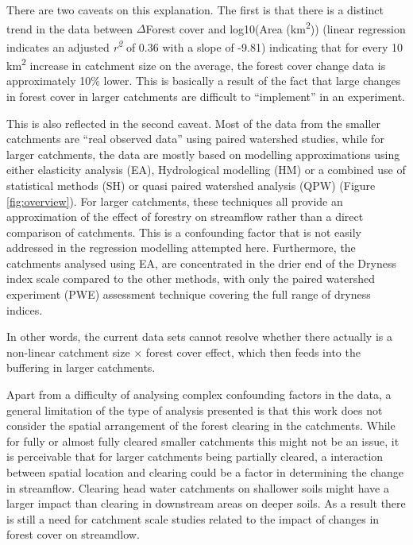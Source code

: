 \documentclass[]{elsarticle} %
\begin{document}
There are two caveats on this explanation. The first is that there is a distinct trend in the data between \(\Delta\)Forest cover and log10(Area (km\textsuperscript{2})) (linear regression indicates an adjusted \emph{r\textsuperscript{2}} of 0.36 with a slope of -9.81) indicating that for every 10 km\textsuperscript{2} increase in catchment size on the average, the forest cover change data is approximately 10\% lower. This is basically a result of the fact that large changes in forest cover in larger catchments are difficult to ``implement'' in an experiment.

This is also reflected in the second caveat. Most of the data from the smaller catchments are ``real observed data'' using paired watershed studies, while for larger catchments, the data are mostly based on modelling approximations using either elasticity analysis (EA), Hydrological modelling (HM) or a combined use of statistical methods (SH) or quasi paired watershed analysis (QPW) (Figure \ref{fig:overview}). For larger catchments, these techniques all provide an approximation of the effect of forestry on streamflow rather than a direct comparison of catchments. This is a confounding factor that is not easily addressed in the regression modelling attempted here. Furthermore, the catchments analysed using EA, are concentrated in the drier end of the Dryness index scale compared to the other methods, with only the paired watershed experiment (PWE) assessment technique covering the full range of dryness indices.

In other words, the current data sets cannot resolve whether there actually is a non-linear catchment size × forest cover effect, which then feeds into the buffering in larger catchments.

Apart from a difficulty of analysing complex confounding factors in the data, a general limitation of the type of analysis presented is that this work does not consider the spatial arrangement of the forest clearing in the catchments. While for fully or almost fully cleared smaller catchments this might not be an issue, it is perceivable that for larger catchments being partially cleared, a interaction between spatial location and clearing could be a factor in determining the change in streamflow. Clearing head water catchments on shallower soils might have a larger impact than clearing in downstream areas on deeper soils. As a result there is still a need for catchment scale studies related to the impact of changes in forest cover on streamdlow.
\end{document}
